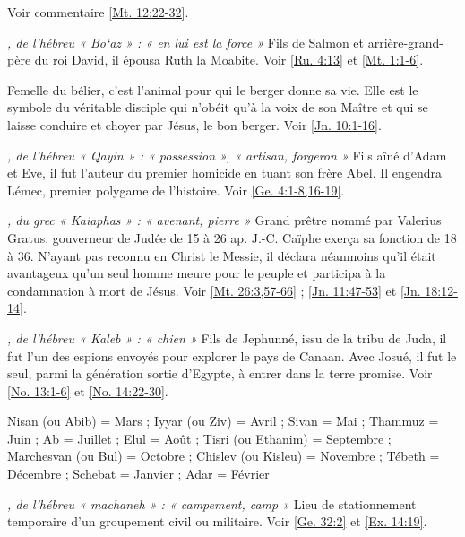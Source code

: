 \begin{multicols}{2}
\textit{}\newline
Voir commentaire \vref{Mt. 12:22-32}.

\textit{, de l'hébreu « Bo`az » : « en lui est la force »}\newline
Fils de Salmon et arrière-grand-père du roi David, il épousa Ruth la Moabite. Voir \vref{Ru. 4:13} et \vref{Mt. 1:1-6}.

\textit{}\newline
Femelle du bélier, c'est l'animal pour qui le berger donne sa vie. Elle est le symbole du véritable disciple qui n'obéit qu'à la voix de son Maître et qui se laisse conduire et choyer par Jésus, le bon berger. Voir \vref{Jn. 10:1-16}.

\textit{, de l'hébreu « Qayin » : « possession », « artisan, forgeron »}\newline
Fils aîné d'Adam et Eve, il fut l'auteur du premier homicide en tuant son frère Abel. Il engendra Lémec, premier polygame de l'histoire. Voir \vref{Ge. 4:1-8,16-19}.

\textit{, du grec « Kaiaphas » : « avenant, pierre »}\newline
Grand prêtre nommé par Valerius Gratus, gouverneur de Judée de 15 à 26 ap. J.-C. Caïphe exerça sa fonction de 18 à 36. N'ayant pas reconnu en Christ le Messie, il déclara néanmoins qu'il était avantageux qu'un seul homme meure pour le peuple et participa à la condamnation à mort de Jésus. Voir \vref{Mt. 26:3,57-66} ; \vref{Jn. 11:47-53} et \vref{Jn. 18:12-14}.

\textit{, de l'hébreu « Kaleb » : « chien »}\newline
Fils de Jephunné, issu de la tribu de Juda, il fut l'un des espions envoyés pour explorer le pays de Canaan. Avec Josué, il fut le seul, parmi la génération sortie d'Egypte, à entrer dans la terre promise. Voir \vref{No. 13:1-6} et \vref{No. 14:22-30}.

\textit{}\newline
Nisan (ou Abib) = Mars ; Iyyar (ou Ziv) = Avril ; Sivan = Mai ; Thammuz = Juin ; Ab = Juillet ; Elul = Août ; Tisri (ou Ethanim) = Septembre ; Marchesvan (ou Bul) = Octobre ; Chislev (ou Kisleu) = Novembre ; Tébeth = Décembre ; Schebat = Janvier ; Adar = Février

\textit{, de l'hébreu « machaneh » : « campement, camp »}\newline
Lieu de stationnement temporaire d'un groupement civil ou militaire. Voir \vref{Ge. 32:2} et \vref{Ex. 14:19}.


\end{multicols}
